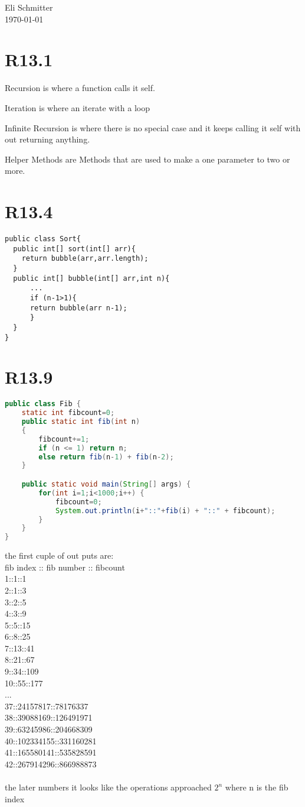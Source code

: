 \documentclass{article}
\begin{document}
\begin{flushleft}
  Eli Schmitter\\
  \today
\end{flushleft}
\section{R13.1}
\begin{alphalist}
\item Recursion is where a function calls it self.
\item Iteration is where an iterate with a loop
\item Infinite Recursion is where there is no special case and it keeps calling it self with out returning anything.
\item Helper Methods are Methods that are used to make a one parameter to two or more.
\end{alphalist}
\section{R13.4}
\begin{lstlisting}
public class Sort{
  public int[] sort(int[] arr){
    return bubble(arr,arr.length);
  }
  public int[] bubble(int[] arr,int n){
      ...
      if (n-1>1){
      return bubble(arr n-1);
      }
  }
}
\end{lstlisting}
\section{R13.9}
\begin{lstlisting}[language=Java]
public class Fib {
    static int fibcount=0;
    public static int fib(int n)
    {
        fibcount+=1;
        if (n <= 1) return n;
        else return fib(n-1) + fib(n-2);
    }

    public static void main(String[] args) {
        for(int i=1;i<1000;i++) {
            fibcount=0;
            System.out.println(i+"::"+fib(i) + "::" + fibcount);
        }
    }
}
\end{lstlisting}
the first cuple of out puts are:\\
fib index :: fib number :: fibcount\\
1::1::1\\
2::1::3\\
3::2::5\\
4::3::9\\
5::5::15\\
6::8::25\\
7::13::41\\
8::21::67\\
9::34::109\\
10::55::177\\
...\\
37::24157817::78176337\\
38::39088169::126491971\\
39::63245986::204668309\\
40::102334155::331160281\\
41::165580141::535828591\\
42::267914296::866988873\\\\
 the later numbers it looks like the operations approached $2^n$ where n is the fib index
\end{document}
